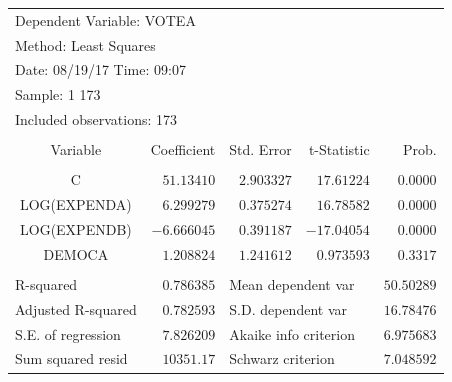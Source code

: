 \documentclass[12pt]{report}
\begin{document}
\begin{table}[H]
	\centering
	\begin{tabular}{lrrrr}
		\multicolumn{3}{l}{Dependent Variable: VOTEA}&\multicolumn{1}{c}{}&\multicolumn{1}{c}{}\\
		\multicolumn{3}{l}{Method: Least Squares}&\multicolumn{1}{c}{}&\multicolumn{1}{c}{}\\
		\multicolumn{3}{l}{Date: 08/19/17   Time: 09:07}&\multicolumn{1}{c}{}&\multicolumn{1}{c}{}\\
		\multicolumn{2}{l}{Sample: 1 173}&\multicolumn{1}{c}{}&\multicolumn{1}{c}{}&\multicolumn{1}{c}{}\\
		\multicolumn{3}{l}{Included observations: 173}&\multicolumn{1}{c}{}&\multicolumn{1}{c}{}\\
		[4.5pt] \hline \\ [-4.5pt]
		\multicolumn{1}{c}{Variable}&\multicolumn{1}{r}{Coefficient}&\multicolumn{1}{r}{Std. Error}&\multicolumn{1}{r}{t-Statistic}&\multicolumn{1}{r}{Prob.}\\
		[4.5pt] \hline \\ [-4.5pt]
		\multicolumn{1}{c}{C}&\multicolumn{1}{r}{$51.13410$}&\multicolumn{1}{r}{$2.903327$}&\multicolumn{1}{r}{$17.61224$}&\multicolumn{1}{r}{$0.0000$}\\
		\multicolumn{1}{c}{LOG(EXPENDA)}&\multicolumn{1}{r}{$6.299279$}&\multicolumn{1}{r}{$0.375274$}&\multicolumn{1}{r}{$16.78582$}&\multicolumn{1}{r}{$0.0000$}\\
		\multicolumn{1}{c}{LOG(EXPENDB)}&\multicolumn{1}{r}{$-6.666045$}&\multicolumn{1}{r}{$0.391187$}&\multicolumn{1}{r}{$-17.04054$}&\multicolumn{1}{r}{$0.0000$}\\
		\multicolumn{1}{c}{DEMOCA}&\multicolumn{1}{r}{$1.208824$}&\multicolumn{1}{r}{$1.241612$}&\multicolumn{1}{r}{$0.973593$}&\multicolumn{1}{r}{$0.3317$}\\
		[4.5pt] \hline \\ [-4.5pt]
		\multicolumn{1}{l}{R-squared}&\multicolumn{1}{r}{$0.786385$}&\multicolumn{2}{l}{Mean dependent var}&\multicolumn{1}{r}{$50.50289$}\\
		\multicolumn{1}{l}{Adjusted R-squared}&\multicolumn{1}{r}{$0.782593$}&\multicolumn{2}{l}{S.D. dependent var}&\multicolumn{1}{r}{$16.78476$}\\
		\multicolumn{1}{l}{S.E. of regression}&\multicolumn{1}{r}{$7.826209$}&\multicolumn{2}{l}{Akaike info criterion}&\multicolumn{1}{r}{$6.975683$}\\
		\multicolumn{1}{l}{Sum squared resid}&\multicolumn{1}{r}{$10351.17$}&\multicolumn{2}{l}{Schwarz criterion}&\multicolumn{1}{r}{$7.048592$}\\

\end{tabular}
\end{table}
\end{document}
